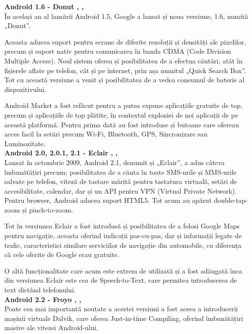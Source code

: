\documentclass[12pt, a4paper, oneside]{article}
\begin{document}
\textbf{Android 1.6 - Donut \cite{AndroidVersionsHistory}, \cite{AndroidHistory}, \cite{DeveloperAndroid}}\\
În același an al lansării Android 1.5, Google a lansat și noua versiune, 1.6, numită „Donut”.
	
	Aceasta aducea suport pentru ecrane de diferite rezoluții și densități ale pixelilor, precum și suport nativ pentru comunicarea în banda CDMA (Code Division Multiple Access). Noul sistem oferea și posibilitatea de a efectua căutări, atât în fișierele aflate pe telefon, cât și pe internet, prin așa numitul „Quick Search Box”. Tot cu această versiune a venit și posibilitatea de a vedea consumul de baterie al dispozitivului.
	
	Android Market a fost refăcut pentru a putea expune aplicațiile gratuite de top, precum și aplicațiile de top plătite, în contextul exploziei de noi aplicații de pe această platformă. Pentru prima dată au fost introduse și butoane care ofereau acces facil la setări precum Wi-Fi, Bluetooth, GPS, Sincronizare sau Luminozitate.\\

\textbf{Android 2.0, 2.0.1, 2.1 - Eclair \cite{AndroidVersionsHistory}, \cite{AndroidHistory}, \cite{DeveloperAndroid}}\\
Lansat în octombrie 2009, Android 2.1, denumit și „Eclair”, a adus câteva îmbunătățiri precum: posibilitatea de a căuta în toate SMS-urile și MMS-urile salvate pe telefon, viteză de tastare mărită pentru tastatura virtuală, setări de accesibilitate, calendar, dar și un API pentru VPN (Virtual Private Network). Pentru browser, Android aducea suport HTML5. Tot acum au apărut double-tap-zoom și pinch-to-zoom.
	
	Tot în versiunea Eclair a fost introdusă și posibilitatea de a folosi Google Maps pentru navigație, aceasta oferind indicații pas-cu-pas, dar și informații legate de trafic, caracteristici similare serviciilor de navigație din automobile, cu diferența că cele oferite de Google erau gratuite.

	O altă funcționalitate care acum este extrem de utilizată și a fost adăugată înca din versiunea Eclair este cea de Speech-to-Text, care permitea introducerea de text dictând telefonului.\\
	
\textbf{Android 2.2 - Froyo \cite{AndroidVersionsHistory}, \cite{AndroidHistory}, \cite{DeveloperAndroid}}\\
Poate cea mai importantă noutate a acestei versiuni a fost aceea a introducerii mașinii virtuale Dalvik, care oferea Just-in-time Compiling, oferind îmbunătățiri masive ale vitezei Android-ului.
\end{document}
